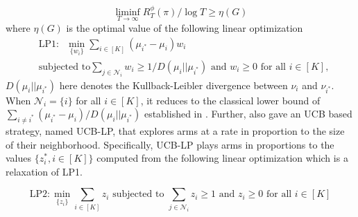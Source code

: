 \begin{equation}
	\liminf_{T \rightarrow \infty} R^{\phi}_T(\pi)/\log T \geq \eta(G)
	\end{equation}
		where $\eta(G)$ is the optimal value of the following linear optimization
	\begin{align}
	& \mbox{LP1}:\; \;\displaystyle\min_{\{w_i\}}\sum_{i \in [K]}(\mu_{i^*}- \mu_i) w_i \nonumber\\
	\label{eqn:LowerBoundLP}
	& \mbox{subjected to} \sum_{j \in \mathcal{N}_i}w_i\geq 1/D(\mu_i || \mu_{i^*}) \mbox{ and } w_i \geq 0 \mbox{  for all } i\in [K],
	\end{align}
$D(\mu_i || \mu_{i^*})$ here denotes the Kullback-Leibler divergence between $\nu_i$ and $\nu_{i^*}$. 
When $\mathcal{N}_i=\{i\}$ for all $i\in [K]$, it reduces to the classical lower bound of $\sum_{i\neq i^*}(\mu_{i^*}- \mu_i)/D(\mu_i || \mu_{i^*})$ established in \cite{AAM85_Asymptotically_LaiRobbins}. Further, \cite{Sigmetrics15_StochasticBanditsWithSideObservations_BuccapatnamEriyilmazShroff} also gave an UCB based strategy, named UCB-LP, that explores arms at a rate in proportion to the size of their neighborhood. Specifically, UCB-LP plays arms in proportions to the values $\{z_i^*, i\in [K]\}$ computed from the following linear optimization which is a relaxation of LP1. 

	\begin{equation}
	\label{eqn:LowerRelaxedBoundLP}
	\mbox{LP2}: \displaystyle\min_{\{z_i\}}\sum_{i \in [K]} z_i 
	 \mbox{ subjected to } \sum_{j \in \mathcal{N}_i}z_i\geq 1 \mbox{ and } z_i \geq 0 \mbox{  for all } i\in [K]
	\end{equation}

